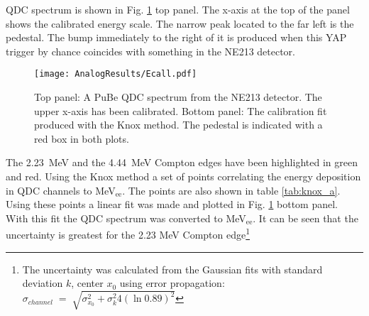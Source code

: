 \documentclass[main.tex]{subfiles}
\begin{document}
QDC spectrum is shown in Fig. \ref{fig:qdc_a} top panel. The x-axis at the top of the panel shows the calibrated energy scale. The narrow peak located to the far left is the pedestal. The bump immediately to the right of it is produced when this YAP trigger by chance coincides with something in the NE213 detector.
\begin{figure}[ht!]
    \centering
        \texttt{[image: AnalogResults/Ecall.pdf]}
        \caption[Energy calibration of the analog setup]{Top panel: A PuBe QDC spectrum from the NE213 detector. The upper x-axis has been calibrated. Bottom panel: The calibration fit produced with the Knox method. The pedestal is indicated with a red box in both plots.}
    \label{fig:qdc_a}
\end{figure}

The \SI{2.23}{MeV} and the \SI{4.44}{MeV} Compton edges have been highlighted in green and red. Using the Knox method a set of points correlating the energy deposition in QDC channels to \si{\MeV}$_\text{ee}$. The points are also shown in table \ref{tab:knox_a}. Using these points a linear fit was made and plotted in Fig. \ref{fig:qdc_a} bottom panel. With this fit the QDC spectrum was converted to \si{\MeV}$_\text{ee}$. It can be seen that the uncertainty is greatest for the 2.23 \si{\MeV} Compton edge\footnote{The uncertainty was calculated from the Gaussian fits with standard deviation $k$, center ${x}_0$ using error propagation: $\sigma_{channel}\;=\;\sqrt{\sigma_{x_0}^2 + \sigma_{k}^2 4\left(\ln0.89\right)^2 }$}
\end{document}
